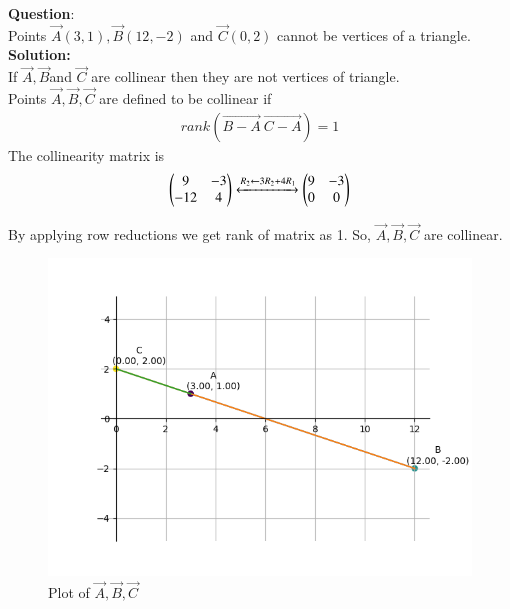 \documentclass[journal]{IEEEtran}
\begin{document}
      \textbf{Question}:\\
     Points $\vec{A}(3,1), \vec{B}(12,-2)$  and $ \vec{C}(0,2) $ cannot be vertices of a triangle.  \\
\textbf{Solution: } \\
       If $\vec{A},\vec{B}$and $\vec{C}$ are collinear then they are not vertices of triangle.  \\
  Points $\vec{A},\vec{B},\vec{C} $ are defined to be collinear if \\
                                 \begin{align}  rank(\vec{B-A}  \  \vec{C-A} ) = 1 \end{align}
                                 The collinearity matrix  is \\
                          \begin{align}       \begin{pmatrix}9 & -3 
                                 \\ -12 & 4\end{pmatrix} 
                                  \xleftrightarrow[]{R_2 \leftarrow {3R_2+4R_1}}
 \begin{pmatrix}
   9 & -3 
   \\
   0 & 0
 \end{pmatrix}
 \end{align}
 
 By applying row reductions we get rank of matrix as 1. So, $\vec{A},\vec{B},\vec{C} $ are collinear.
\begin{figure}[h!]
   \centering
   \includegraphics[width=0.7\linewidth]{figs/Figure_1.png}
	\caption{Plot of $\vec{A},\vec{B},\vec{C}$}
   \label{stemplot}
\end{figure}
\end{document}
